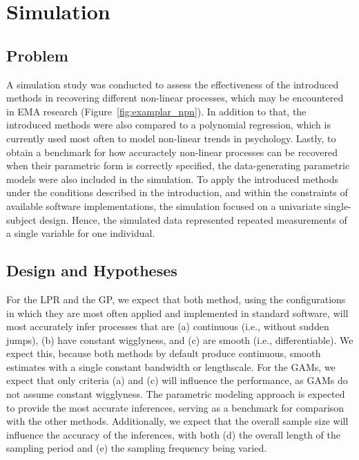 \documentclass[man, floatsintext]{apa7}
\begin{document}
\section{Simulation} \label{simulation}

\subsection{Problem}

A simulation study was conducted to assess the effectiveness of the introduced
methods in recovering different non-linear processes, which may be encountered
in EMA research (Figure~\ref{fig:examplar_npn}). In addition to that, the
introduced methods were also compared to a polynomial regression, which is
currently used most often to model non-linear trends in psychology. Lastly, to
obtain a benchmark for how accuractely non-linear processes can be recovered
when their parametric form is correctly specified, the data-generating
parametric models were also included in the simulation. To apply the
introduced methods under the conditions described in the introduction, and
within the constraints of available software implementations, the simulation
focused on a univariate single-subject design. Hence, the simulated data
represented repeated measurements of a single variable for one individual.

\subsection{Design and Hypotheses}

For the LPR and the GP, we expect that both method, using the configurations in
which they are most often applied and implemented in standard software, will
most accurately infer processes that are (a) continuous (i.e., without sudden
jumps), (b) have constant wigglyness, and (c) are smooth (i.e.,
differentiable). We expect this, because both methods by default produce
continuous, smooth estimates with a single constant bandwidth or lengthscale.
For the GAMs, we expect that only criteria (a) and (c) will influence the
performance, as GAMs do not assume constant wigglyness. The parametric modeling
approach is expected to provide the most accurate inferences, serving as a
benchmark for comparison with the other methods. Additionally, we expect that
the overall sample size will influence the accuracy of the inferences, with
both (d) the overall length of the sampling period and (e) the sampling
frequency being varied.
\end{document}
